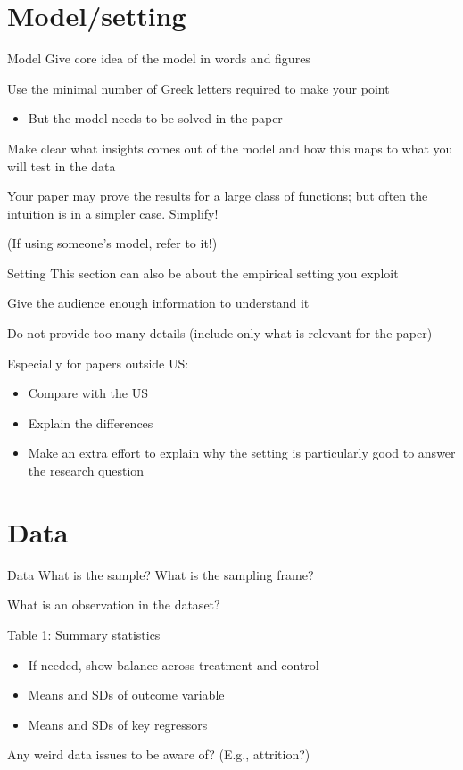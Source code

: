 \documentclass[aspectratio=169, 11pt]{beamer}
\begin{document}
\section{Model/setting}

\begin{frame}{Model}
    Give core idea of the model in words and figures
    
    Use the minimal number of Greek letters required to make your point\\
    \begin{itemize}
        \item But the model needs to be solved in the paper
    \end{itemize}
    
    Make clear what insights comes out of the model and how this maps to what you will test in the data
    
    Your paper may prove the results for a large class of functions; but often the intuition is in a simpler case. Simplify!
    
    \small (If using someone's model, refer to it!)
\end{frame}

\begin{frame}{Setting}
    This section can also be about the empirical setting you exploit
    
    Give the audience enough information to understand it
    
    Do not provide too many details (include only what is relevant for the paper)
    
    Especially for papers outside US:
    \begin{itemize}
        \item Compare with the US
        \item Explain the differences
        \item Make an extra effort to explain why the setting is particularly good to answer the research question
    \end{itemize}
\end{frame}

\section{Data}

\begin{frame}{Data}
    What is the sample? What is the sampling frame?
    
    What is an observation in the dataset?
    
    Table 1: Summary statistics\\
    \begin{itemize}
        \item If needed, show balance across treatment and control
        \item Means and SDs of outcome variable
        \item Means and SDs of key regressors
    \end{itemize}
    
    Any weird data issues to be aware of? (E.g., attrition?)
\end{frame}
\end{document}
